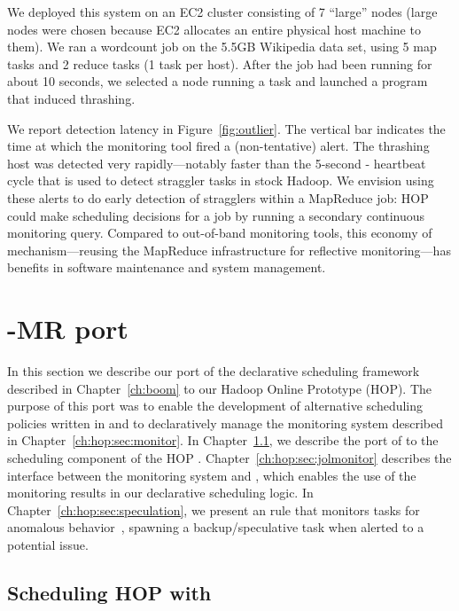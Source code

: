 We deployed this system on an EC2 cluster consisting of 7 ``large''
nodes (large nodes were chosen because EC2 allocates an entire
physical host machine to them). We ran a wordcount job on the 5.5GB Wikipedia
data set, using 5 map tasks and 2 reduce tasks (1 task per host). After
the job had been running for about 10 seconds, we selected a node
running a task and launched a program that induced thrashing.

We report detection latency in Figure~\ref{fig:outlier}. The vertical bar
indicates the time at which the monitoring tool fired a (non-tentative)
alert. The thrashing host was detected very rapidly---notably faster than the
5-second {\TT}-{\JT} heartbeat cycle that is used to detect straggler tasks in
stock Hadoop. We envision using these alerts to do early detection of stragglers
within a MapReduce job: HOP could make scheduling decisions for a job by running
a secondary continuous monitoring query. Compared to out-of-band monitoring
tools, this economy of mechanism---reusing the MapReduce infrastructure for
reflective monitoring---has benefits in software maintenance and system
management.

\section{\BOOM-MR port}
\label{ch:hop:sec:boom}

In this section we describe our port of the declarative scheduling framework
described in Chapter~\ref{ch:boom} to our Hadoop Online Prototype (HOP).  The
purpose of this port was to enable the development of alternative scheduling
policies written in \OVERLOG and to declaratively manage the monitoring system
described in Chapter~\ref{ch:hop:sec:monitor}.  In
Chapter~\ref{ch:hop:sec:jolport}, we describe the port of \JOL to the
scheduling component of the HOP \JT.  Chapter~\ref{ch:hop:sec:jolmonitor}
describes the interface between the monitoring system and \JOL, which enables
the use of the monitoring results in our declarative scheduling logic.  In
Chapter~\ref{ch:hop:sec:speculation}, we present an \OVERLOG rule that monitors
tasks for anomalous behavior~\cite{hopdemo}, spawning a backup/speculative task
when alerted to a potential issue.

\subsection{Scheduling HOP with \JOL}
\label{ch:hop:sec:jolport}

